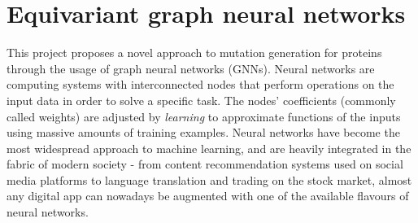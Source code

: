 \section{Equivariant graph neural networks}
This project proposes a novel approach to mutation generation for proteins through the usage of graph neural networks (GNNs). Neural networks are computing systems with interconnected nodes that perform operations on the input data in order to solve a specific task. The nodes' coefficients (commonly called weights) are adjusted by \textit{learning} to approximate functions of the inputs using massive amounts of training examples. Neural networks have become the most widespread approach to machine learning, and are heavily integrated in the fabric of modern society - from content recommendation systems used on social media platforms to language translation and trading on the stock market, almost any digital app can nowadays be augmented with one of the available flavours of neural networks. 

